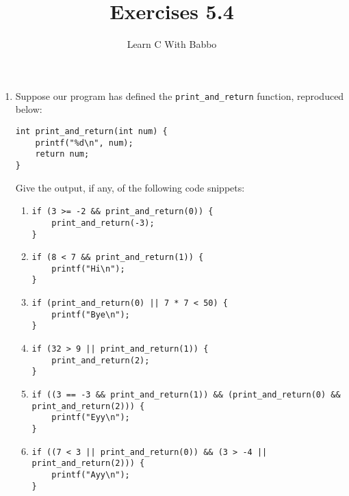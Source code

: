 \documentclass{article}
\begin{document}
\title{Exercises 5.4}
\author{Learn C With Babbo}
\date{}
\maketitle

\begin{enumerate}
\item Suppose our program has defined the \verb|print_and_return| function, reproduced below:
\begin{lstlisting}[style=CStyle]
int print_and_return(int num) {
    printf("%d\n", num);
    return num;
}
\end{lstlisting}

Give the output, if any, of the following code snippets:
\begin{enumerate}
\item
\begin{lstlisting}[style=CStyle]
if (3 >= -2 && print_and_return(0)) {
    print_and_return(-3);
}
\end{lstlisting}

\item
\begin{lstlisting}[style=CStyle]
if (8 < 7 && print_and_return(1)) {
    printf("Hi\n");
}
\end{lstlisting}

\item
\begin{lstlisting}[style=CStyle]
if (print_and_return(0) || 7 * 7 < 50) {
    printf("Bye\n");
}
\end{lstlisting}

\item
\begin{lstlisting}[style=CStyle]
if (32 > 9 || print_and_return(1)) {
    print_and_return(2);
}
\end{lstlisting}

\item
\begin{lstlisting}[style=CStyle]
if ((3 == -3 && print_and_return(1)) && (print_and_return(0) && print_and_return(2))) {
    printf("Eyy\n");
}
\end{lstlisting}

\item
\begin{lstlisting}[style=CStyle]
if ((7 < 3 || print_and_return(0)) && (3 > -4 || print_and_return(2))) {
    printf("Ayy\n");
} 
\end{lstlisting}

\end{enumerate}
\end{enumerate}
\end{document}
